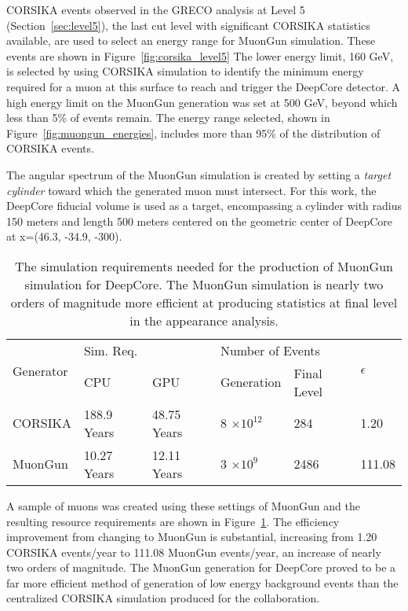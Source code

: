 CORSIKA events observed in the GRECO analysis at Level 5 (Section~\ref{sec:level5}), the last cut level with significant CORSIKA statistics available, are used to select an energy range for MuonGun simulation.
These events are shown in Figure~\ref{fig:corsika_level5}
The lower energy limit, 160 GeV, is selected by using CORSIKA simulation to identify the minimum energy required for a muon at this surface to reach and trigger the DeepCore detector.
A high energy limit on the MuonGun generation was set at 500 GeV, beyond which less than 5\% of events remain.
The energy range selected, shown in Figure~\ref{fig:muongun_energies}, includes more than 95\% of the distribution of CORSIKA events.

The angular spectrum of the MuonGun simulation is created by setting a \emph{target cylinder} toward which the generated muon must intersect.
For this work, the DeepCore fiducial volume is used as a target, encompassing a cylinder with radius 150 meters and length 500 meters centered on the geometric center of DeepCore at x=(46.3, -34.9, -300). 

\begin{table}[]
\centering
\begin{tabular}{@{}llllll@{}}
\toprule
\multirow{2}{*}{Generator} & \multicolumn{2}{l}{Sim. Req.} & \multicolumn{2}{l}{Number of Events} & \multirow{2}{*}{$\epsilon$} \\
                           & CPU                  & GPU                  & Generation               &Final Level         &                             \\ \midrule
CORSIKA                    & 188.9 Years          & 48.75 Years          & 8 $\times 10^{12}$         & 284                    & 1.20                        \\
MuonGun         & 10.27 Years          & 12.11 Years          & 3 $\times 10^9$          & 2486                   & 111.08                      \\ \bottomrule
\end{tabular}
\caption{The simulation requirements needed for the production of MuonGun simulation for DeepCore. The MuonGun simulation is nearly two orders of magnitude more efficient at producing statistics at final level in the appearance analysis.}
\label{tab:muongun_stats}
\end{table} 

A sample of muons was created using these settings of MuonGun and the resulting resource requirements are shown in Figure~\ref{tab:muongun_stats}.
The efficiency improvement from changing to MuonGun is substantial, increasing from 1.20 CORSIKA events/year to 111.08 MuonGun events/year, an increase of nearly two orders of magnitude.
The MuonGun generation for DeepCore proved to be a far more efficient method of generation of low energy background events than the centralized CORSIKA simulation produced for the collaboration.

